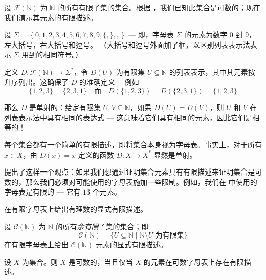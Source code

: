 \begin{example}
\label{exFiniteDescriptionOfFiniteSubsetsOfN}
设 $\mathcal{F}(\mathbb{N})$ 为 $\mathbb{N}$ 的所有有限子集的集合。根据 ，我们已知此集合是可数的；现在我们演示其元素的有限描述。

设 $\Sigma = \left\{ 0,1,2,3,4,5,6,7,8,9,\boxed{\{},\boxed{\}},\boxed{,} \right\}$ --- 即，字母表 $\Sigma$ 的元素为数字 $0$ 到 $9$，左大括号，右大括号和逗号。 （大括号和逗号外面加了框，以区别列表表示法表示 $\Sigma$ 用到的相同符号。）

定义 $D : \mathcal{F}(\mathbb{N}) \to \Sigma^*$，令 $D(U)$ 为有限集 $U \subseteq \mathbb{N}$ 的列表表示，其中其元素按升序列出。这确保了 $D$ 的准确定义--- 例如
\[ \{1,2,3\} = \{2,3,1\} \quad \text{而} \quad D(\{1,2,3\}) = D(\{2,3,1\}) = \{1,2,3\} \] 

那么 $D$ 是单射的：给定有限集 $U, V \subseteq \mathbb{N}$，如果 $D(U) = D(V)$，则 $U$ 和 $V$ 在列表表示法中具有相同的表达式 --- 这意味着它们具有相同的元素，因此它们是相等的！
\end{example}

\begin{example}
\label{exTrivialFiniteDescription}
每个集合都有一个简单的有限描述，即将集合本身视为字母表。事实上，对于所有 $x \in X$，由 $D(x) = x$ 定义的函数 $D : X \to X^*$ 显然是单射。
\end{example}

 提出了这样一个观点：如果我们想通过证明集合元素具有有限描述来证明集合是可数的，那么我们必须对可能使用的字母表施加一些限制。例如，我们在  中使用的字母表是有限的 --- 它有 $13$ 个元素。

\begin{exercise}
\label{exFiniteDescriptionOfQ}
在有限字母表上给出有理数的显式有限描述。
\end{exercise}

\begin{exercise}
\label{exFiniteDescriptionOfCofiniteSubsetsOfN}
设 $\mathcal{C}(\mathbb{N})$ 为 $\mathbb{N}$ 的所有\textit{余有限}子集的集合；即
\[ \mathcal{C}(\mathbb{N}) = \{ U \subseteq \mathbb{N} \mid \mathbb{N} \setminus U \text{ 为有限集} \} \]
在有限字母表上给出 $\mathcal{C}(\mathbb{N})$ 元素的显式有限描述。
\end{exercise}

\begin{theorem}
\label{thmCountableIffFiniteDescription}
设 $X$ 为集合。则 $X$ 是可数的，当且仅当 $X$ 的元素在可数字母表上存在有限描述。
\end{theorem}


